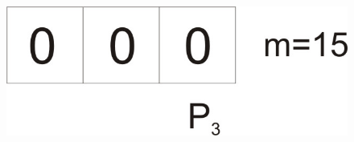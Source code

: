 \begin{frame}
\vspace{-1.5mm}
\begin{figure}[t]
		\includegraphics{figures/SlotMach4.jpg}
\end{figure}
\end{frame}

